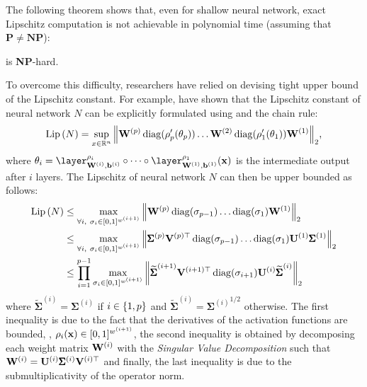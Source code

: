 \noindent
The following theorem shows that, even for shallow neural network, exact Lipschitz computation is not achievable in polynomial time (assuming that $\mathbf{P} \neq \textbf{NP}$):
\begin{theorem}
   is \textbf{NP}-hard.
\end{theorem}


\noindent
To overcome this difficulty, researchers have relied on devising tight upper bound of the Lipschitz constant.
For example, \citet{scaman2018lipschitz} have shown that the Lipschitz constant of neural network $N$ can be explicitly formulated using  and the chain rule:
\begin{equation}
  \operatorname{Lip}{(N)} = \sup_{x \in \mathbb{R}^n} \norm{\mathbf{W}^{(p)} \operatorname*{diag}(\rho'_p(\theta_p)) \dots \mathbf{W}^{(2)} \operatorname*{diag}(\rho'_1(\theta_1)) \mathbf{W}^{(1)}}_2,
  \label{equation:ch3-decomposition_jacobian_lipschitz}
\end{equation}
where $\theta_i = \layer^{\act_i}_{\Wmat^{(i)}, \bvec^{(i)}} \circ \cdots \circ \layer^{\act_1}_{\Wmat^{(1)}, \bvec^{(1)}}(\xvec)$ is the intermediate output after $i$ layers.
The Lipschitz of neural network $N$ can then be upper bounded as follows:
\begin{align}
  \operatorname{Lip}{(N)} &\leq \max_{\forall i,\ \sigma_i \in [0, 1]^{w^{(i+1)}}} \norm{\mathbf{W}^{(p)} \operatorname*{diag}(\sigma_{p-1}) \dots \operatorname*{diag}(\sigma_1) \mathbf{W}^{(1)}}_2 \notag \\
  &\leq \max_{\forall i,\ \sigma_i \in [0, 1]^{w^{(i+1)}}} \norm{ \pmb{\Sigma}^{(p)} \mathbf{V}^{(p)\top} \operatorname*{diag}(\sigma_{p-1}) \dots \operatorname*{diag}(\sigma_1) \mathbf{U}^{(1)} \pmb{\Sigma}^{(1)}}_2 \notag \\
  &\leq \prod_{i=1}^{p-1} \max_{\sigma_i \in [0, 1]^{w^{(i+1)}}} \norm{\widetilde{\pmb{\Sigma}}^{(i+1)} \mathbf{V}^{(i+1)\top} \operatorname*{diag}(\sigma_{i+1}) \mathbf{U}^{(i)} \widetilde{\pmb{\Sigma}}^{(i)}}_2 
\end{align}
where $\widetilde{\pmb{\Sigma}}^{(i)} = \pmb{\Sigma}^{(i)}$ if $i \in \{1, p\}$ and $\widetilde{\pmb{\Sigma}}^{(i)} = {\pmb{\Sigma}^{(i)}}^{1/2}$ otherwise.
The first inequality is due to the fact that the derivatives of the activation functions are bounded, \ie, $\rho_i(\mathbf{x}) \in [0, 1]^{w^{(i+1)}}$, the second inequality is obtained by decomposing each weight matrix $\mathbf{W}^{(i)}$ with the \emph{Singular Value Decomposition} such that $\mathbf{W}^{(i)} = \mathbf{U}^{(i)} \pmb{\Sigma}^{(i)} \mathbf{V}^{(i)\top}$ and finally, the last inequality is due to the submultiplicativity of the operator norm.
